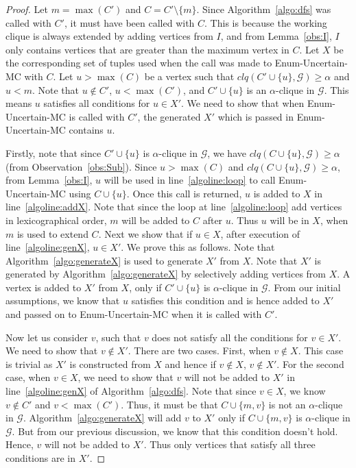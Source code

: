 \documentclass[11pt,letterpaper]{article}
\newcommand{\ugraph}{\mathcal{G}}
\newcommand{\cliqueprob}{clq}
\begin{document}
\begin{proof}
Let $m = \max(C')$ and $C = C' \setminus \{ m\}$.
Since Algorithm~\ref{algo:dfs} was called with $C'$, 
it must have been called with $C$. This is because the working clique is always 
extended by adding vertices from $I$, and from Lemma~\ref{obs:I},
$I$ only contains vertices that are greater than the maximum vertex in $C$.
Let $X$ be the corresponding set of tuples used when the call was made to 
Enum-Uncertain-MC with $C$. Let $u > \max(C)$ be a vertex such that 
$\cliqueprob(C' \cup \{ u \},\ugraph) \ge \alpha$ and $u < m$.
Note that $u \not \in C'$, $u < \max(C')$, and 
$C' \cup \{ u \}$ is an $\alpha$-clique in $\ugraph$. 
This means $u$ satisfies all conditions for $u \in X'$.
We need to show that when Enum-Uncertain-MC is called with $C'$,
the generated $X'$ which is passed in Enum-Uncertain-MC contains $u$.

Firstly, note that since $C' \cup \{ u \}$ is $\alpha$-clique in $\ugraph$,
we have $\cliqueprob(C \cup \{ u \},\ugraph) \ge \alpha$ (from Observation~\ref{obs:Sub}).
Since $u > \max(C)$ and $\cliqueprob(C \cup \{ u \},\ugraph) \ge \alpha$,
from Lemma~\ref{obs:I}, $u$ will be used in line~\ref{algoline:loop}
to call Enum-Uncertain-MC using $C \cup \{ u \}$.
Once this call is returned, $u$ is added to $X$ in line~\ref{algoline:addX}.
Note that since the loop at line~\ref{algoline:loop} add vertices in 
lexicographical order, $m$ will be added to $C$ after $u$.
Thus $u$ will be in $X$, when $m$ is used to extend $C$.
Next we show that if $u \in X$, after execution of line~\ref{algoline:genX},
$u \in X'$. We prove this as follows. Note that Algorithm~\ref{algo:generateX} 
is used to generate $X'$ from $X$. Note that $X'$ is generated by 
Algorithm~\ref{algo:generateX} by selectively adding vertices from $X$.
A vertex is added to $X'$ from $X$, only if $C' \cup \{ u \}$ is $\alpha$-clique in $\ugraph$. 
From our initial assumptions, we know that $u$ satisfies this condition and is 
hence added to $X'$ and passed on to Enum-Uncertain-MC when it is called with $C'$.

Now let us consider $v$, such that $v$ does not satisfy all the conditions
for $v \in X'$. We need to show that $v \not \in X'$. There are two cases.
First, when $v \not \in X$. This case is trivial as $X'$ is constructed from
$X$ and hence if $v \not \in X$, $v \not \in X'$.
For the second case, when $v \in X$, we need to show that $v$
will not be added to $X'$ in line~\ref{algoline:genX} of Algorithm~\ref{algo:dfs}. 
Note that since $v \in X$, we know $v \not \in C'$ and $v < \max(C')$.
Thus, it must be that $C \cup \{ m, v \}$ is not an $\alpha$-clique in $\ugraph$.
Algorithm~\ref{algo:generateX} will add $v$ to $X'$ only if
$C \cup \{ m, v \}$ is $\alpha$-clique in $\ugraph$. 
But from our previous discussion, we know that this condition doesn't hold.
Hence, $v$ will not be added to $X'$.
Thus only vertices that satisfy all three conditions are in $X'$.  
\end{proof}
\end{document}
